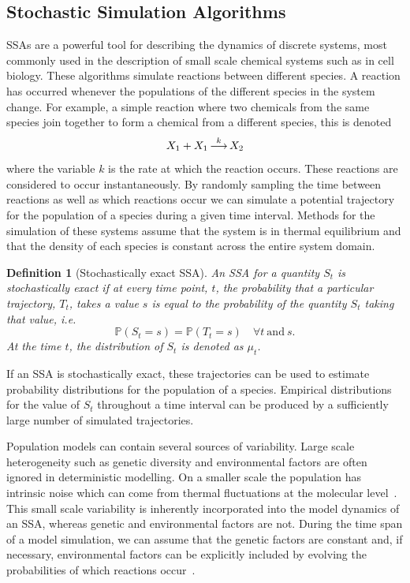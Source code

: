 \documentclass[final]{siamltex}
\newcommand{\into}{\operatornamewithlimits{\longrightarrow}}
\newtheorem{dfn}{Definition}[section]
\begin{document}
\subsection{Stochastic Simulation Algorithms}\label{sec:SSAs}

SSAs are a powerful tool for describing the dynamics of discrete systems, most commonly used in the description of small scale chemical systems such as in cell biology. These algorithms simulate reactions between different species. A reaction has occurred whenever the populations of the different species in the system change. For example, a simple reaction where two chemicals from the same species join together to form a chemical from a different species, this is denoted
\begin{equation}\label{eqn:chem_reaction}
	X_1 + X_1 \into^{k} X_2
\end{equation}
where the variable $k$ is the rate at which the reaction occurs. These reactions are considered to occur instantaneously. By randomly sampling the time between reactions as well as which reactions occur we can simulate a potential trajectory for the population of a species during a given time interval. Methods for the simulation of these systems assume that the system is in thermal equilibrium and that the density of each species is constant across the entire system domain.

\begin{dfn}[Stochastically exact SSA]
An SSA for a quantity $S_t$ is stochastically exact if at every time point, $t$, the probability that a particular trajectory, $T_t$, takes a value $s$ is equal to the probability of the quantity $S_t$ taking that value, i.e.
\[
	\mathbb{P}(S_t = s) = \mathbb{P}(T_t = s)\quad \forall t \ \text{and} \ s.
\]
At the time $t$, the distribution of $S_t$ is denoted as $\mu_t$.
\end{dfn}
If an SSA is stochastically exact, these trajectories can be used to estimate probability distributions for the population of a species. Empirical distributions for the value of $S_t$ throughout a time interval can be produced by a sufficiently large number of simulated trajectories.

Population models can contain several sources of variability. Large scale heterogeneity such as genetic diversity and environmental factors are often ignored in deterministic modelling. On a smaller scale the population has intrinsic noise which can come from thermal fluctuations at the molecular level~\cite{szekely2014stochastic,mcadams1999sa}. This small scale variability is inherently incorporated into the model dynamics of an SSA, whereas genetic and environmental factors are not. During the time span of a model simulation, we can assume that the genetic factors are constant and, if necessary, environmental factors can be explicitly included by evolving the probabilities of which reactions occur~\cite{shahrezaei2008colored}.
\end{document}
